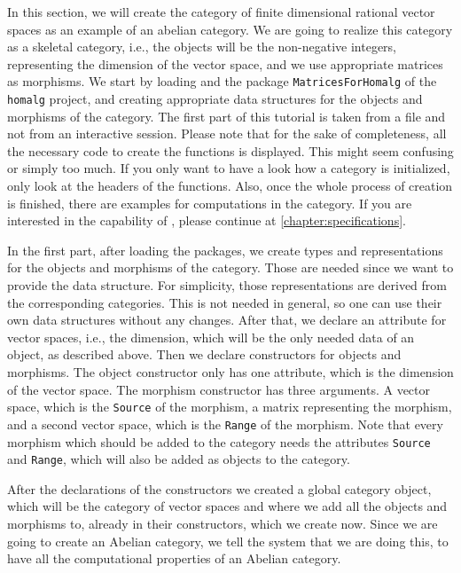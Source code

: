 In this section, we will create the category of finite dimensional rational vector spaces as an
example of an abelian category. We are going
to realize this category as a skeletal category, i.e., the objects will be the non-negative integers,
representing the dimension of the vector space, and we use appropriate matrices as morphisms. We start
by loading \CapPkg and the package \texttt{MatricesForHomalg} of the \texttt{homalg} project, and creating appropriate data structures
for the objects and morphisms of the category. The first part of this tutorial is taken from a file and not from
an interactive session. Please note that for the sake of completeness, all the necessary code to create the
functions is displayed. This might seem confusing or simply too much. If you only want to have a look how a \CapPkg category
is initialized, only look at the headers of the functions. Also, once the whole process of creation is finished,
there are examples for computations in the category. If you are interested in the capability of \CapPkg, please
continue at \ref{chapter:specifications}. %

In the first part, after loading the packages, we create types and representations for the objects
and morphisms of the category. Those are needed since we want to provide the data structure. For simplicity,
those representations are derived from the corresponding \CapPkg \GAP categories. This is not needed in general,
so one can use their own data structures without any changes. After that, we declare an attribute for vector spaces,
i.e., the dimension, which will be the only needed data of an object, as described above. Then we declare constructors
for objects and morphisms. The object constructor only has one attribute, which is the dimension of the vector space.
The morphism constructor has three arguments. A vector space, which is the \texttt{Source} of the morphism, a matrix
representing the morphism, and a second vector space, which is the \texttt{Range} of the morphism. Note that every morphism
which should be added to the category needs the \GAP attributes \texttt{Source} and \texttt{Range}, which will also be
added as objects to the category.



After the declarations of the constructors we created a global category \GAP object, which will be the category
of vector spaces and where we add all the objects and morphisms to, already in their constructors, which we create now.
Since we are going to create an Abelian category, we tell the system that we are doing this, to have all the computational
properties of an Abelian category.


